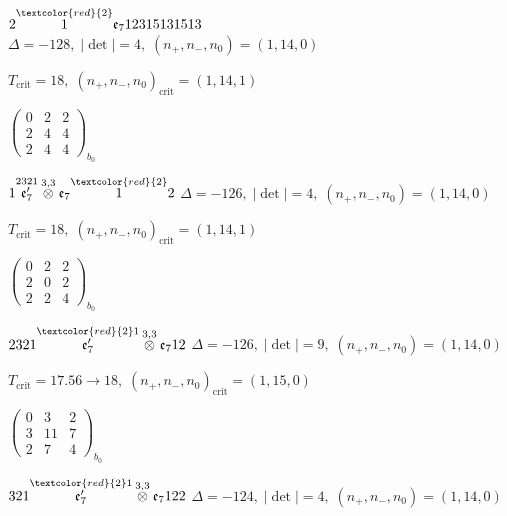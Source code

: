 \documentclass[10pt]{article}
\begin{document}
\smallskip

$2\overset{\textcolor{red}{2}}{1}\mathfrak{e}_712315131513$ \quad $\Delta=-128,\; |\det|=4,\; (n_+,n_-,n_0)=(1,14,0)$

\hspace{1em}$T_{\text{crit}}=18,\; (n_+,n_-,n_0)_{\text{crit}}=(1,14,1)$

\hspace{2em}$\left(\begin{smallmatrix}0 & 2 & 2 \\ 2 & 4 & 4 \\ 2 & 4 & 4\end{smallmatrix}\right)_{\!b_0}$

\smallskip

$1\overset{2321}{\mathfrak{e}_7'}\overset{3,3}{\otimes}\mathfrak{e}_7\overset{\textcolor{red}{2}}{1}2$ \quad $\Delta=-126,\; |\det|=4,\; (n_+,n_-,n_0)=(1,14,0)$

\hspace{1em}$T_{\text{crit}}=18,\; (n_+,n_-,n_0)_{\text{crit}}=(1,14,1)$

\hspace{2em}$\left(\begin{smallmatrix}0 & 2 & 2 \\ 2 & 0 & 2 \\ 2 & 2 & 4\end{smallmatrix}\right)_{\!b_0}$

$2321\overset{\textcolor{red}{2}1}{\mathfrak{e}_7'}\overset{3,3}{\otimes}\mathfrak{e}_712$ \quad $\Delta=-126,\; |\det|=9,\; (n_+,n_-,n_0)=(1,14,0)$

\hspace{1em}$T_{\text{crit}}=17.56 \to 18,\; (n_+,n_-,n_0)_{\text{crit}}=(1,15,0)$

\hspace{2em}$\left(\begin{smallmatrix}0 & 3 & 2 \\ 3 & 11 & 7 \\ 2 & 7 & 4\end{smallmatrix}\right)_{\!b_0}$

\smallskip

$321\overset{\textcolor{red}{2}1}{\mathfrak{e}_7'}\overset{3,3}{\otimes}\mathfrak{e}_7122$ \quad $\Delta=-124,\; |\det|=4,\; (n_+,n_-,n_0)=(1,14,0)$
\end{document}
